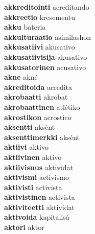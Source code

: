 \textbf{akkreditointi } acreditando \\
\textbf{akkreetio } kresementu \\
\textbf{akku } bateria \\
\textbf{akkulturaatio } asimilashon \\
\textbf{akkusatiivi } akusativo \\
\textbf{akkusatiivisija } akusativo \\
\textbf{akkusatorinen } acusativo \\
\textbf{akne } akné \\
\textbf{akreditoida } acredita \\
\textbf{akrobaatti } akrobat \\
\textbf{akrobaattinen } atlétiko \\
\textbf{akrostikon } acrostico \\
\textbf{aksentti } aksènt \\
\textbf{aksenttimerkki } aksènt \\
\textbf{aktiivi } aktivo \\
\textbf{aktiivinen } aktivo \\
\textbf{aktiivisuus } aktividat \\
\textbf{aktivismi } activismo \\
\textbf{aktivisti } activista \\
\textbf{aktivistinen } activista \\
\textbf{aktiviteetti } aktividat \\
\textbf{aktivoida } kapitalisá \\
\textbf{aktori } aktor \\
